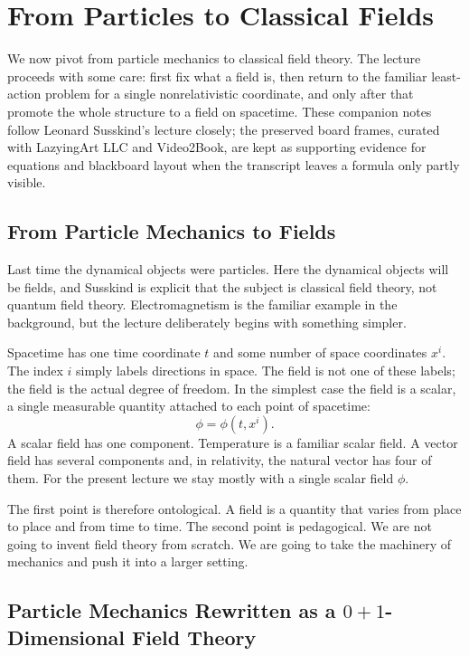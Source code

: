 \chapter{From Particles to Classical Fields}

We now pivot from particle mechanics to classical field theory. The lecture proceeds with some care: first fix what a field is, then return to the familiar least-action problem for a single nonrelativistic coordinate, and only after that promote the whole structure to a field on spacetime. These companion notes follow Leonard Susskind's lecture closely; the preserved board frames, curated with LazyingArt LLC and Video2Book, are kept as supporting evidence for equations and blackboard layout when the transcript leaves a formula only partly visible.

\section{From Particle Mechanics to Fields}

Last time the dynamical objects were particles. Here the dynamical objects will be fields, and Susskind is explicit that the subject is classical field theory, not quantum field theory. Electromagnetism is the familiar example in the background, but the lecture deliberately begins with something simpler.

Spacetime has one time coordinate \(t\) and some number of space coordinates \(x^i\). The index \(i\) simply labels directions in space. The field is not one of these labels; the field is the actual degree of freedom. In the simplest case the field is a scalar, a single measurable quantity attached to each point of spacetime:
\begin{equation}
\phi=\phi(t,x^i).
\end{equation}
A scalar field has one component. Temperature is a familiar scalar field. A vector field has several components and, in relativity, the natural vector has four of them. For the present lecture we stay mostly with a single scalar field \(\phi\).

The first point is therefore ontological. A field is a quantity that varies from place to place and from time to time. The second point is pedagogical. We are not going to invent field theory from scratch. We are going to take the machinery of mechanics and push it into a larger setting.

\section{Particle Mechanics Rewritten as a \(0+1\)-Dimensional Field Theory}

